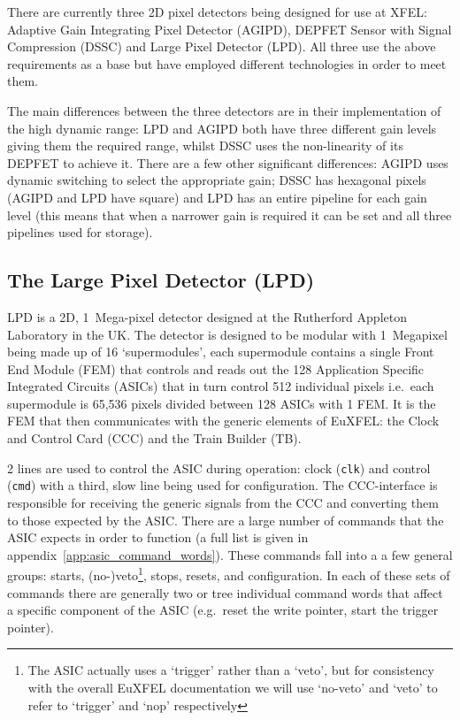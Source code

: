 There are currently three 2D pixel detectors being designed for use at XFEL: Adaptive Gain Integrating Pixel Detector (AGIPD), DEPFET Sensor with Signal Compression (DSSC) and Large Pixel Detector (LPD). All three use the above requirements as a base but have employed different technologies in order to meet them.

The main differences between the three detectors are in their implementation of the high dynamic range: LPD and AGIPD both have three different gain levels giving them the required range, whilst DSSC uses the non-linearity of its DEPFET to achieve it. There are a few other significant differences: AGIPD uses dynamic switching to select the appropriate gain; DSSC has hexagonal pixels (AGIPD and LPD have square) and LPD has an entire pipeline for each gain level (this means that when a narrower gain is required it can be set and all three pipelines used for storage). 

\subsection{The Large Pixel Detector (LPD)} %
\label{sub:the_large_pixel_detector_lpd}
LPD is a 2D, 1~Mega-pixel detector designed at the Rutherford Appleton Laboratory in the UK. The detector is designed to be modular with 1~Megapixel being made up of 16 `supermodules', each supermodule contains a single Front End Module (FEM) that controls and reads out the 128 Application Specific Integrated Circuits (ASICs) that in turn control 512 individual pixels i.e.\ each supermodule is 65,536 pixels divided between 128 ASICs with 1 FEM. It is the FEM that then communicates with the generic elements of EuXFEL: the Clock and Control Card (CCC) and the Train Builder (TB).
    
2 lines are used to control the ASIC during operation: clock (\texttt{clk}) and control (\texttt{cmd}) with a third, slow line being used for configuration. The CCC-interface is responsible for receiving the generic signals from the CCC and converting them to those expected by the ASIC. There are a large number of commands that the ASIC expects in order to function (a full list is given in appendix~\ref{app:asic_command_words}). These commands fall into a a few general groups: starts, (no-)veto\footnote{The ASIC actually uses a `trigger' rather than a `veto', but for consistency with the overall EuXFEL documentation we will use `no-veto' and `veto' to refer to `trigger' and `nop' respectively}, stops, resets, and configuration. In each of these sets of commands there are generally two or tree individual command words that affect a specific component of the ASIC (e.g.\ reset the write pointer, start the trigger pointer). 
    
